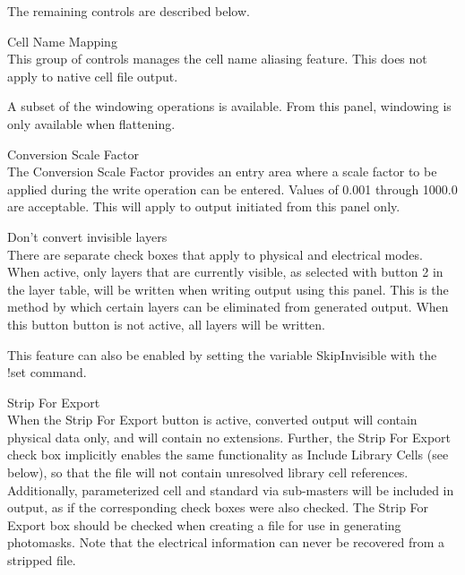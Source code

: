 The remaining controls are described below.

\begin{description}
\item{\cb Cell Name Mapping}\\
This group of controls manages the cell name aliasing feature.  This
does not apply to native cell file output.

A subset of the windowing operations is available.  From this panel,
windowing is only available when flattening.

\item{\cb Conversion Scale Factor}\\
The {\cb Conversion Scale Factor} provides an entry area where a scale
factor to be applied during the write operation can be entered. 
Values of 0.001 through 1000.0 are acceptable.  This will apply to
output initiated from this panel only.

\item{\cb Don't convert invisible layers}\\
There are separate check boxes that apply to physical and electrical
modes.  When active, only layers that are currently visible, as
selected with button 2 in the layer table, will be written when
writing output using this panel.  This is the method by which certain
layers can be eliminated from generated output.  When this button
button is not active, all {\Xic} layers will be written.

This feature can also be enabled by setting the variable {\et
SkipInvisible} with the {\cb !set} command.

\item{\cb Strip For Export}\\
When the {\cb Strip For Export} button is active, converted output
will contain physical data only, and will contain no {\Xic}
extensions.  Further, the {\cb Strip For Export} check box implicitly
enables the same functionality as {\cb Include Library Cells} (see
below), so that the file will not contain unresolved library cell
references.  Additionally, parameterized cell and standard via
sub-masters will be included in output, as if the corresponding check
boxes were also checked.  The {\cb Strip For Export} box should be
checked when creating a file for use in generating photomasks.  Note
that the electrical information can never be recovered from a stripped
file.


\end{description}
